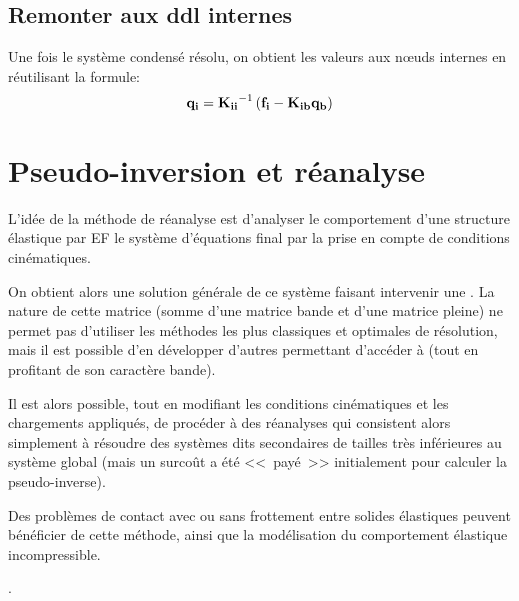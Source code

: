 \medskip
\subsection{Remonter aux ddl internes}
Une fois le système condensé résolu, on obtient les valeurs aux nœuds
internes en réutilisant la formule:
\begin{equation}
\VV{q_i} = \MMI{K_{ii}}\left(\VV{f_i}-\MM{K_{ib}}\VV{q_b}\right)
\end{equation}

\medskip
\section{Pseudo-inversion et réanalyse}\label{Sec-PInv}

\medskip
L'idée de la méthode de réanalyse est d'analyser le comportement d'une structure
élastique par EF  le système d'équations final par la prise en
compte de conditions cinématiques.

On obtient alors une solution générale de ce système faisant intervenir une
. La nature de cette matrice (somme
d'une matrice bande et d'une matrice pleine) ne permet pas d'utiliser les méthodes
les plus classiques et optimales de résolution, mais il est possible d'en développer d'autres
permettant d'accéder à  (tout en profitant de son caractère bande).

Il est alors possible, tout en modifiant les conditions cinématiques et les chargements appliqués,
de procéder à des réanalyses qui consistent alors simplement à résoudre des systèmes
dits secondaires de tailles très inférieures au système global (mais un surcoût a été
<<~payé~>> initialement pour calculer la pseudo-inverse).

Des problèmes de contact avec ou sans frottement entre solides élastiques peuvent
bénéficier de cette méthode, ainsi que la modélisation du comportement élastique
incompressible.

\medskip
{}.


